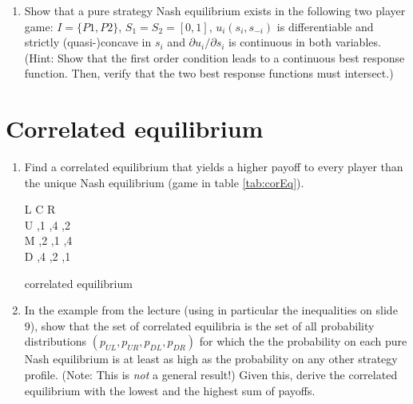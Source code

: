 \documentclass[a4paper,12pt]{article}
\begin{document}
\begin{enumerate}
\item Show that a pure strategy Nash equilibrium exists in the following two player game: $I=\{P1,P2\}$, $S_1=S_2=[0,1]$, $u_i(s_i,s_{-i})$ is differentiable and strictly (quasi-)concave in $s_i$ and $\partial u_i/\partial s_i$ is continuous in both variables.\\
  (Hint: Show that the first order condition leads to a continuous best response function. Then, verify that the two best response functions must intersect.)
\end{enumerate}

\section{Correlated equilibrium}
\label{sec:corr-equil}
\begin{enumerate}
\item Find a correlated equilibrium that yields a higher payoff to every player than the unique Nash equilibrium (game in table \ref{tab:corEq}).
   \begin{table}[h]
\centering
 \begin{game}{3}{3}
       \> L \> C \>R\\ %
U   ,1   ,4 ,2   \\
M   ,2   ,1 ,4 \\
D  ,4    ,2  ,1
\end{game}  
\caption{correlated equilibrium}
\label{tab:corEq}
\end{table}
\item In the example from the lecture (using in particular the inequalities on slide 9), show that the set of correlated equilibria is the set of all probability distributions $(p_{UL},p_{UR},p_{DL},p_{DR})$ for which the the probability on each pure Nash equilibrium is at least as high as the probability on any other strategy profile. (Note: This is \emph{not} a general result!) Given this, derive the correlated equilibrium with the lowest and the highest sum of payoffs. 
\end{enumerate}
\end{document}
